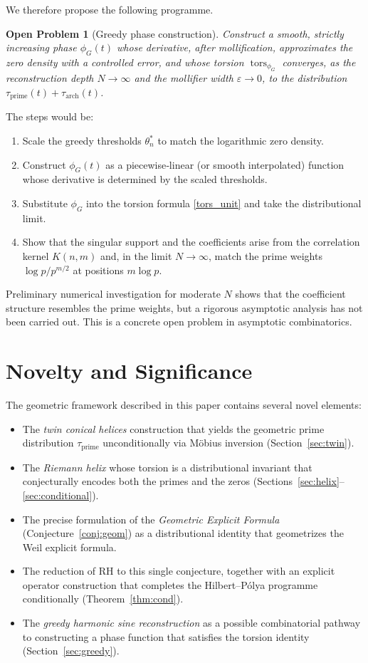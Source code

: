\documentclass[11pt,a4paper]{article}
\newtheorem*{openproblem}{Open Problem}
\newcommand{\tors}{\operatorname{tors}}
\begin{document}
We therefore propose the following programme.

\begin{openproblem}[Greedy phase construction]
Construct a smooth, strictly increasing phase \(\phi_G(t)\) whose derivative, after mollification, approximates the zero density with a controlled error, and whose torsion \(\tors_{\phi_G}\) converges, as the reconstruction depth \(N\to\infty\) and the mollifier width \(\varepsilon\to0\), to the distribution \(\tau_{\text{prime}}(t) + \tau_{\text{arch}}(t)\).
\end{openproblem}

The steps would be:
\begin{enumerate}
\item Scale the greedy thresholds \(\theta_n^*\) to match the logarithmic zero density.
\item Construct \(\phi_G(t)\) as a piecewise‑linear (or smooth interpolated) function whose derivative is determined by the scaled thresholds.
\item Substitute \(\phi_G\) into the torsion formula \eqref{tors_unit} and take the distributional limit.
\item Show that the singular support and the coefficients arise from the correlation kernel \(K(n,m)\) and, in the limit \(N\to\infty\), match the prime weights \(\log p/p^{m/2}\) at positions \(m\log p\).
\end{enumerate}

Preliminary numerical investigation for moderate \(N\) shows that the coefficient structure resembles the prime weights, but a rigorous asymptotic analysis has not been carried out.  This is a concrete open problem in asymptotic combinatorics.

\section{Novelty and Significance}\label{sec:novelty}

The geometric framework described in this paper contains several novel elements:
\begin{itemize}
\item The \emph{twin conical helices} construction that yields the geometric prime distribution \(\tau_{\text{prime}}\) unconditionally via M\"obius inversion (Section~\ref{sec:twin}).
\item The \emph{Riemann helix} whose torsion is a distributional invariant that conjecturally encodes both the primes and the zeros (Sections~\ref{sec:helix}--\ref{sec:conditional}).
\item The precise formulation of the \emph{Geometric Explicit Formula} (Conjecture~\ref{conj:geom}) as a distributional identity that geometrizes the Weil explicit formula.
\item The reduction of RH to this single conjecture, together with an explicit operator construction that completes the Hilbert–P\'olya programme conditionally (Theorem~\ref{thm:cond}).
\item The \emph{greedy harmonic sine reconstruction} as a possible combinatorial pathway to constructing a phase function that satisfies the torsion identity (Section~\ref{sec:greedy}).
\end{itemize}
\end{document}
